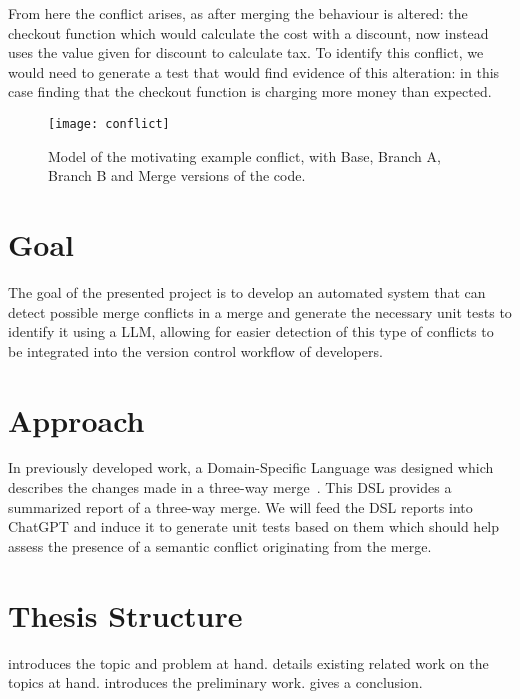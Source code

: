 From here the conflict arises, as after merging the behaviour is altered: the checkout function which would calculate the cost with a discount, now instead uses the value given for discount to calculate tax. To identify this conflict, we would need to generate a test that would find evidence of this alteration: in this case finding that the checkout function is charging more money than expected.

\begin{figure}[t]
    \texttt{[image: conflict]}
    \caption{Model of the motivating example conflict, with Base, Branch A, Branch B and Merge versions of the code.}
    \label{fig:conflict}
\end{figure}

\section{Goal} \label{sec:goal}

The goal of the presented project is to develop an automated system that can detect possible merge conflicts in a merge and generate the necessary unit tests to identify it using a LLM, allowing for easier detection of this type of conflicts to be integrated into the version control workflow of developers.

\section{Approach} \label{sec:approach}

In previously developed work, a Domain-Specific Language was designed which describes the changes made in a three-way merge~\cite{kn:nuno}. This DSL provides a summarized report of a three-way merge. We will feed the DSL reports into ChatGPT and induce it to generate unit tests based on them which should help assess the presence of a semantic conflict originating from the merge.






\section{Thesis Structure} \label{sec:struct}


 introduces the topic and problem at hand.
 details existing related work on the topics at hand.
 introduces the preliminary work.
 gives a conclusion.